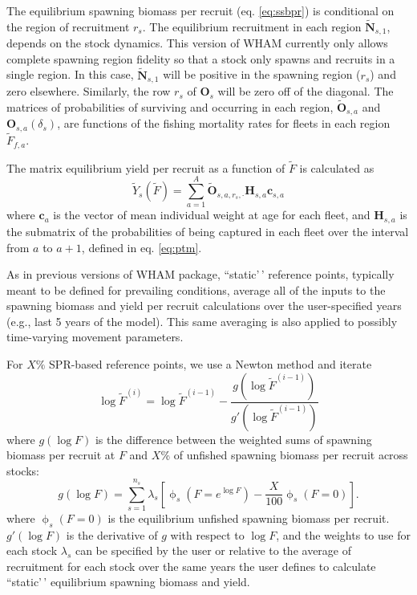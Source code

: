 \documentclass[
]{article}
\begin{document}
The equilibrium spawning biomass per recruit (eq. \ref{eq:ssbpr}) is
conditional on the region of recruitment \(r_s\). The equilibrium
recruitment in each region \(\widetilde {\mathbf{N}}_{s,1}\), depends on
the stock dynamics. This version of WHAM currently only allows complete
spawning region fidelity so that a stock only spawns and recruits in a
single region. In this case, \(\widetilde {\mathbf{N}}_{s,1}\) will be
positive in the spawning region (\(r_s\)) and zero elsewhere. Similarly,
the row \(r_s\) of \(\mathbf{O}_s\) will be zero off of the diagonal.
The matrices of probabilities of surviving and occurring in each region,
\(\widetilde{\mathbf{O}}_{s,a}\) and \(\mathbf{O}_{s,a}(\delta_s)\), are
functions of the fishing mortality rates for fleets in each region
\(\widetilde F_{f,a}\).

The matrix equilibrium yield per recruit as a function of
\(\widetilde F\) is calculated as \begin{equation}\label{eq:ypr}
 \widetilde{Y}_s({\widetilde{F}}) = \sum^{A}_{a=1} \widetilde{\mathbf{O}}_{s,a,r_s,\cdot} \mathbf{H}_{s,a} \mathbf{c}_{s,a}
\end{equation} where \(\mathbf{c}_a\) is the vector of mean individual
weight at age for each fleet, and \(\mathbf{H}_{s,a}\) is the submatrix
of the probabilities of being captured in each fleet over the interval
from \(a\) to \(a+1\), defined in eq. \ref{eq:ptm}.

As in previous versions of WHAM package, ``static'\,' reference points,
typically meant to be defined for prevailing conditions, average all of
the inputs to the spawning biomass and yield per recruit calculations
over the user-specified years (e.g., last 5 years of the model). This
same averaging is also applied to possibly time-varying movement
parameters.

For \(X\%\) SPR-based reference points, we use a Newton method and
iterate \begin{equation}\label{eq:newton}
  \log\widetilde{F}^{(i)} = \log\widetilde{F}^{(i-1)} - \frac{g\left(\log\widetilde{F}^{(i-1)}\right)}{g'\left(\log\widetilde{F}^{(i-1)}\right)}
\end{equation} where \(g(\log F)\) is the difference between the
weighted sums of spawning biomass per recruit at \(F\) and \(X\)\% of
unfished spawning biomass per recruit across stocks: \begin{equation*}
  g(\log F) = \sum^{n_s}_{s=1} \lambda_s\left[\upphi_s\left(F = e^{\log F}\right) - \frac{X}{100}\upphi_s\left(F=0\right)\right].
\end{equation*} where \(\upphi_s\left(F=0\right)\) is the equilibrium
unfished spawning biomass per recruit. \(g'(\log F)\) is the derivative
of \(g\) with respect to \(\log F\), and the weights to use for each
stock \(\lambda_s\) can be specified by the user or relative to the
average of recruitment for each stock over the same years the user
defines to calculate ``static'\,' equilibrium spawning biomass and
yield.
\end{document}
